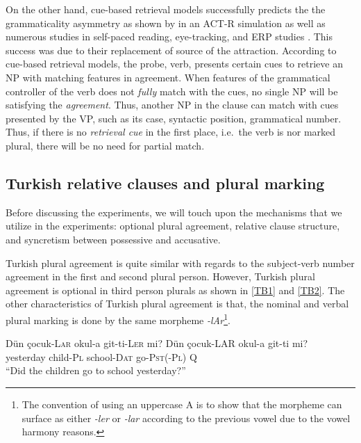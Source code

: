 \documentclass[doc]{apa6}
\let\rmarkdownfootnote\footnote%
\def\footnote{\protect\rmarkdownfootnote}
\begin{document}
On the other hand, cue-based retrieval models successfully predicts the the grammaticality asymmetry as shown by \textcite{Dillon2013} in an ACT-R simulation as well as numerous studies in self-paced reading, eye-tracking, and ERP studies \autocites{Wagers2009}{Tucker2010}{Tanner2014}[ among others]{Lago2015}. This success was due to their replacement of source of the attraction. According to cue-based retrieval models, the probe, verb, presents certain cues to retrieve an NP with matching features in agreement. When features of the grammatical controller of the verb does not \emph{fully} match with the cues, no single NP will be satisfying the \emph{agreement}. Thus, another NP in the clause can match with cues presented by the VP, such as its case, syntactic position, grammatical number. Thus, if there is no \emph{retrieval cue} in the first place, i.e.~the verb is nor marked plural, there will be no need for partial match.

\hypertarget{turkish-relative-clauses-and-plural-marking}{%
\subsection{Turkish relative clauses and plural marking}\label{turkish-relative-clauses-and-plural-marking}}

Before discussing the experiments, we will touch upon the mechanisms that we utilize in the experiments: optional plural agreement, relative clause structure, and syncretism between possessive and accusative.

Turkish plural agreement is quite similar with regards to the subject-verb number agreement in the first and second plural person. However, Turkish plural agreement is optional in third person plurals as shown in \autoref{TB1} and \autoref{TB2}. The other characteristics of Turkish plural agreement is that, the nominal and verbal plural marking is done by the same morpheme \emph{-lAr}\footnote{The convention of using an uppercase A is to show that the morpheme can surface as either \textit{-ler} or \textit{-lar} according to the previous vowel due to the vowel harmony reasons.}.

\begin{exe}
\ex \label{TB1} Dün çocuk-\textsc{Lar} okul-a git-ti-\textsc{Ler} mi?
\ex 
\gll Dün çocuk-LAR okul-a git-ti mi?\\
yesterday child-\textsc{Pl} school-\textsc{Dat} go-\textsc{Pst}(-\textsc{Pl}) Q\\
\trans ``Did the children go to school yesterday?''
\label{TB2}
\end{exe}
\end{document}
